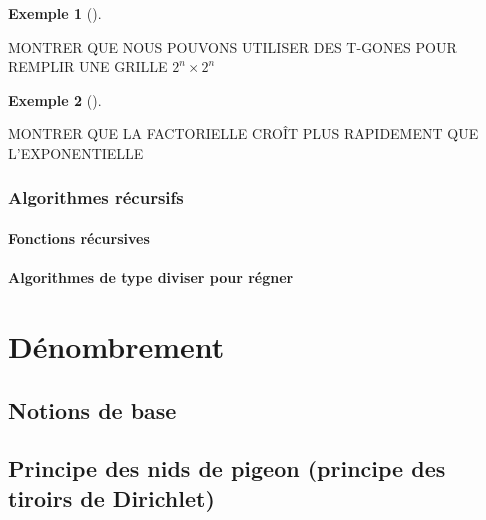 \documentclass[
  letterpaper,
]{scrbook}
\theoremstyle{definition}
\newtheorem{example}{Exemple}[chapter]
\theoremstyle{definition}
\theoremstyle{plain}
\theoremstyle{remark}
\begin{document}
\leavevmode{}%
\begin{example}[]\label{exm-space-filling-shapes}

MONTRER QUE NOUS POUVONS UTILISER DES T-GONES POUR REMPLIR UNE GRILLE
\(2^n \times 2^n\)

\end{example}

\leavevmode{}%
\begin{example}[]\label{exm-exponential-vs-factorial}

MONTRER QUE LA FACTORIELLE CROÎT PLUS RAPIDEMENT QUE L'EXPONENTIELLE

\end{example}

\hypertarget{algorithmes-ruxe9cursifs}{%
\subsection{Algorithmes récursifs}\label{algorithmes-ruxe9cursifs}}

\hypertarget{fonctions-ruxe9cursives}{%
\subsubsection{Fonctions récursives}\label{fonctions-ruxe9cursives}}

\hypertarget{algorithmes-de-type-diviser-pour-ruxe9gner}{%
\subsubsection{Algorithmes de type diviser pour
régner}\label{algorithmes-de-type-diviser-pour-ruxe9gner}}


\hypertarget{duxe9nombrement}{%
\chapter{Dénombrement}\label{duxe9nombrement}}

\hypertarget{notions-de-base}{%
\section{Notions de base}\label{notions-de-base}}

\hypertarget{principe-des-nids-de-pigeon-principe-des-tiroirs-de-dirichlet}{%
\section{Principe des nids de pigeon (principe des tiroirs de
Dirichlet)}\label{principe-des-nids-de-pigeon-principe-des-tiroirs-de-dirichlet}}
\end{document}
